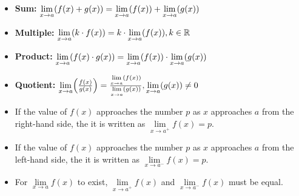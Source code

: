 \documentclass[12pt,a4paper,titlepage]{article}
\DeclarePairedDelimiter {\pars}  {  (      }     {  )      }
\begin{document}
            \begin{SummaryBox}[title=Limits]
                \begin{SummaryExtensionBox}[title=Algebra of limits]
                    \begin{itemize}[leftmargin=*]
                        \item \textbf{Sum:} $\lim\limits_{x \to a} \pars*{ f(x) + g(x) } = \lim\limits_{x \to a} \pars*{ f(x) } + \lim\limits_{x \to a} \pars*{ g(x) }$
                        \item \textbf{Multiple:} $\lim\limits_{x \to a} \pars*{ k \cdot f(x) } = k \cdot \lim\limits_{x \to a} \pars*{ f(x) }, k \in \mathbb{R}$
                        \item \textbf{Product:} $\lim\limits_{x \to a} \pars*{ f(x) \cdot g(x) } = \lim\limits_{x \to a} \pars*{ f(x) } \cdot \lim\limits_{x \to a} \pars*{ g(x) }$
                        \item \textbf{Quotient:} $\lim\limits_{x \to a} \pars*{ \frac{f(x)}{g(x)} } = \frac{\lim\limits_{x \to a} \pars*{ f(x) }}{\lim\limits_{x \to a} \pars*{ g(x) }}, \lim\limits_{x \to a} \pars*{ g(x) } \neq 0$
                    \end{itemize}
                \end{SummaryExtensionBox}
                
                \begin{SummaryExtensionBox}[title=Left and right limits]
                    \begin{itemize}[leftmargin=*]
                        \item If the value of $f(x)$ approaches the number $p$ as $x$ approaches $a$ from the right-hand side, the it is written as $\lim\limits_{x \to a^+} f(x) = p$.
                        \item If the value of $f(x)$ approaches the number $p$ as $x$ approaches $a$ from the left-hand side, the it is written as $\lim\limits_{x \to a^-} f(x) = p$.
                        \item For $\lim\limits_{x \to a} f(x)$ to exist, $\lim\limits_{x \to a^+} f(x)$ and $\lim\limits_{x \to a^-} f(x)$ must be equal.
                    \end{itemize}
                \end{SummaryExtensionBox}
            \end{SummaryBox}
            
\end{document}
